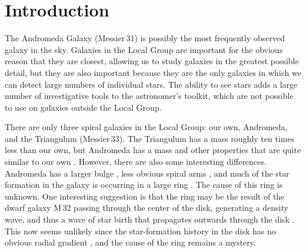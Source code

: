 \documentclass[a4paper,fleqn,usenatbib, twocolumn]{aastex63}
\begin{document}




\section{Introduction}

The Andromeda Galaxy (Messier\,31) is possibly the most frequently observed galaxy in the
sky. Galaxies in the Local Group are important for the
obvious reason that they are closest, allowing us to study galaxies
in the greatest possible detail, but they are
also important because they are the only galaxies in which we can detect large
numbers of individual stars. The ability to see stars adds a large number of
investigative tools to the astronomer's toolkit, which are not possible to
use on galaxies outside the Local Group.


There are only three spiral galaxies in the Local Group: our own, Andromeda, and the Triangulum (Messier\,33). The Triangulum has a mass roughly ten times less
than our own, but Andromeda has a mass and other properties that are quite similar to our own \citep{yin2009}.
However, there are also some interesting differences. Andromeda has a larger bulge \citep{yin2009}, less obvious spiral arms \citep{gordon2006,kirk2015},
and much of the star formation in the galaxy is occurring in a large ring \citep{ford2013}. The cause of this ring is unknown. One interesting suggestion is that the ring may be the result of the dwarf galaxy M\,32 passing through the center of the disk, generating a density wave, and thus a wave of star birth that propagates outwards through the disk \citep{block2006}.
This now seems unlikely since the star-formation history in the disk has no obvious radial gradient \citep{lewis2015}, and the cause of the ring remains a mystery.
\end{document}
